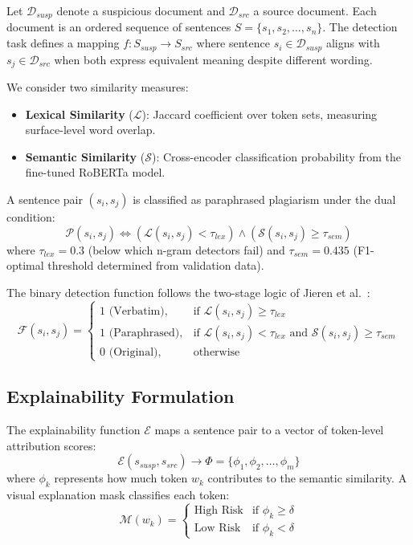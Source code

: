 \documentclass[pdflatex,sn-basic]{sn-jnl}
\begin{document}
Let $\mathcal{D}_{susp}$ denote a suspicious document and $\mathcal{D}_{src}$ a source document. Each document is an ordered sequence of sentences $S=\{s_1, s_2, \ldots, s_n\}$. The detection task defines a mapping $f: S_{susp} \to S_{src}$ where sentence $s_i \in \mathcal{D}_{susp}$ aligns with $s_j \in \mathcal{D}_{src}$ when both express equivalent meaning despite different wording.

We consider two similarity measures:
\begin{itemize}
    \item \textbf{Lexical Similarity} ($\mathcal{L}$): Jaccard coefficient over token sets, measuring surface-level word overlap.
    \item \textbf{Semantic Similarity} ($\mathcal{S}$): Cross-encoder classification probability from the fine-tuned RoBERTa model.
\end{itemize}

A sentence pair $(s_i, s_j)$ is classified as paraphrased plagiarism under the dual condition:
\begin{equation}
\mathcal{P}(s_i, s_j) \iff \left( \mathcal{L}(s_i, s_j) < \tau_{lex} \right) \land \left( \mathcal{S}(s_i, s_j) \geq \tau_{sem} \right)
\end{equation}
where $\tau_{lex} = 0.3$ (below which n-gram detectors fail) and $\tau_{sem} = 0.435$ (F1-optimal threshold determined from validation data).

The binary detection function follows the two-stage logic of Jieren et al.~\cite{jieren2025twostage}:
\begin{equation}
\mathcal{F}(s_i, s_j) =
\begin{cases}
1 \text{ (Verbatim)}, & \text{if } \mathcal{L}(s_i, s_j) \geq \tau_{lex} \\
1 \text{ (Paraphrased)}, & \text{if } \mathcal{L}(s_i, s_j) < \tau_{lex} \text{ and } \mathcal{S}(s_i, s_j) \geq \tau_{sem} \\
0 \text{ (Original)}, & \text{otherwise}
\end{cases}
\end{equation}

\subsection{Explainability Formulation}

The explainability function $\mathcal{E}$ maps a sentence pair to a vector of token-level attribution scores:
\begin{equation}
\mathcal{E}(s_{susp}, s_{src}) \rightarrow \Phi = \{\phi_1, \phi_2, \ldots, \phi_m\}
\end{equation}
where $\phi_k$ represents how much token $w_k$ contributes to the semantic similarity. A visual explanation mask classifies each token:
\begin{equation}
\mathcal{M}(w_k) =
\begin{cases}
\text{High Risk} & \text{if } \phi_k \ge \delta \\
\text{Low Risk}  & \text{if } \phi_k < \delta
\end{cases}
\end{equation}
\end{document}
